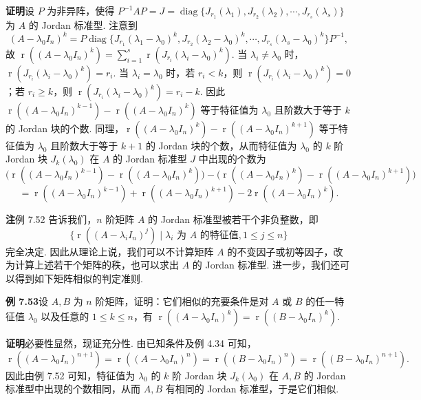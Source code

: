 \documentclass[UTF8,12pt,a4paper,fontset=fandol]{ctexart}
\begin{document}
\noindent\textbf{证明}\quad 设 $P$ 为非异阵，使得 $P^{-1}AP=J=\operatorname{diag}\{J_{r_1}(\lambda_1),J_{r_2}(\lambda_2),\cdots,J_{r_s}(\lambda_s)\}$ 为 $A$ 的 Jordan 标准型. 注意到
\[
(A-\lambda_0I_n)^k
=P\operatorname{diag}\{J_{r_1}(\lambda_1-\lambda_0)^k,J_{r_2}(\lambda_2-\lambda_0)^k,\cdots,J_{r_s}(\lambda_s-\lambda_0)^k\}P^{-1},
\]
故 $\operatorname{r}((A-\lambda_0I_n)^k)=\sum\limits_{i=1}^s\operatorname{r}(J_{r_i}(\lambda_i-\lambda_0)^k)$. 当 $\lambda_i\ne\lambda_0$ 时，$\operatorname{r}(J_{r_i}(\lambda_i-\lambda_0)^k)=r_i$. 当 $\lambda_i=\lambda_0$ 时，若 $r_i<k$，则 $\operatorname{r}(J_{r_i}(\lambda_i-\lambda_0)^k)=0$；若 $r_i\ge k$，则 $\operatorname{r}(J_{r_i}(\lambda_i-\lambda_0)^k)=r_i-k$. 因此 $\operatorname{r}((A-\lambda_0I_n)^{k-1})-\operatorname{r}((A-\lambda_0I_n)^k)$ 等于特征值为 $\lambda_0$ 且阶数大于等于 $k$ 的 Jordan 块的个数. 同理，$\operatorname{r}((A-\lambda_0I_n)^k)-\operatorname{r}((A-\lambda_0I_n)^{k+1})$ 等于特征值为 $\lambda_0$ 且阶数大于等于 $k+1$ 的 Jordan 块的个数，从而特征值为 $\lambda_0$ 的 $k$ 阶 Jordan 块 $J_k(\lambda_0)$ 在 $A$ 的 Jordan 标准型 $J$ 中出现的个数为
\[
\bigl(\operatorname{r}((A-\lambda_0I_n)^{k-1})-\operatorname{r}((A-\lambda_0I_n)^k)\bigr)
-\bigl(\operatorname{r}((A-\lambda_0I_n)^k)-\operatorname{r}((A-\lambda_0I_n)^{k+1})\bigr)
\]
\[
=\operatorname{r}((A-\lambda_0I_n)^{k-1})+\operatorname{r}((A-\lambda_0I_n)^{k+1})
-2\operatorname{r}((A-\lambda_0I_n)^k).
\]

\noindent\textbf{注}\quad 例 7.52 告诉我们，$n$ 阶矩阵 $A$ 的 Jordan 标准型被若干个非负整数，即
\[
\{\operatorname{r}((A-\lambda_iI_n)^j)\mid \lambda_i\text{ 为 }A\text{ 的特征值},1\le j\le n\}
\]
完全决定. 因此从理论上说，我们可以不计算矩阵 $A$ 的不变因子或初等因子，改为计算上述若干个矩阵的秩，也可以求出 $A$ 的 Jordan 标准型. 进一步，我们还可以得到如下矩阵相似的判定准则.

\noindent\textbf{例 7.53}\quad 设 $A,B$ 为 $n$ 阶矩阵，证明：它们相似的充要条件是对 $A$ 或 $B$ 的任一特征值 $\lambda_0$ 以及任意的 $1\le k\le n$，有 $\operatorname{r}((A-\lambda_0I_n)^k)=\operatorname{r}((B-\lambda_0I_n)^k)$.

\noindent\textbf{证明}\quad 必要性显然，现证充分性. 由已知条件及例 4.34 可知，
\[
\operatorname{r}((A-\lambda_0I_n)^{n+1})=\operatorname{r}((A-\lambda_0I_n)^n)
=\operatorname{r}((B-\lambda_0I_n)^n)=\operatorname{r}((B-\lambda_0I_n)^{n+1}).
\]
因此由例 7.52 可知，特征值为 $\lambda_0$ 的 $k$ 阶 Jordan 块 $J_k(\lambda_0)$ 在 $A,B$ 的 Jordan 标准型中出现的个数相同，从而 $A,B$ 有相同的 Jordan 标准型，于是它们相似.
\end{document}
